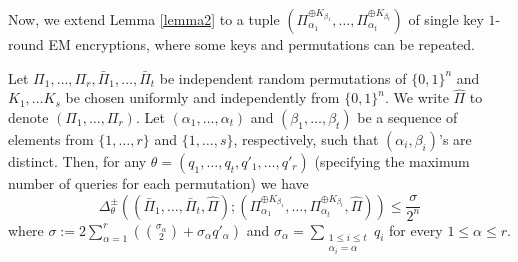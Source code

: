 \documentclass{llncs}
\newcommand{\s}{\{0,1\}}
\begin{document}
Now, we extend Lemma \ref{lemma2} to a tuple $(\Pi_{\alpha_1}^{\oplus K_{\beta_1}}, \ldots, \Pi_{\alpha_t}^{\oplus K_{\beta_t}})$ of single key $1$-round EM encryptions, where some keys and permutations can be repeated.
\begin{lemma}\label{lemma3}
Let $\Pi_1, \ldots, \Pi_r, \bar{\Pi}_1, \ldots, \bar{\Pi}_t$ be independent random permutations of $\s^n$ and $K_1, \ldots K_s$ be chosen uniformly and independently from $\s^n$. We write $\hat{\Pi}$ to denote $(\Pi_1, \ldots, \Pi_r)$. Let $(\alpha_1, \ldots, \alpha_t)$ and  $(\beta_1, \ldots, \beta_t)$ be a sequence of elements from $\{1,\ldots,r\}$ and $\{1,\ldots,s\}$, respectively, such that $(\alpha_i, \beta_i)$'s are distinct. Then, for any $\theta = (q_1, \ldots, q_t, q'_1, \ldots, q'_r)$ (specifying the maximum number of queries for each permutation) we have
\[\Delta^{\pm}_{\theta}\left((\bar{\Pi}_1, \ldots, \bar{\Pi}_t, \hat{\Pi});(\Pi_{\alpha_1}^{\oplus K_{\beta_1}}, \ldots, \Pi_{\alpha_t}^{\oplus K_{\beta_t}}, \hat{\Pi})\right) \leq  \frac{\sigma}{2^n}\]
where
$\sigma :=2\sum_{\alpha=1}^r\left(\binom{\sigma_{\alpha}}{2}+\sigma_{\alpha}q'_{\alpha}\right)$
and $\sigma_{\alpha}=\sum_{\substack{1\leq i\leq t\\\alpha_i=\alpha}}q_i$ for every $1\leq\alpha\leq r$.
\end{lemma}
\end{document}

